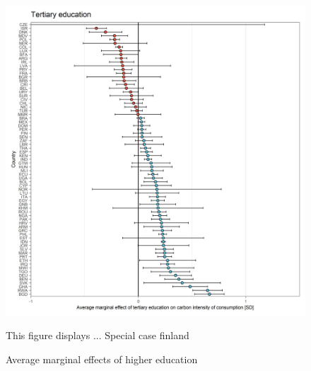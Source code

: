 \documentclass[12pt, a4paper]{article}
\newenvironment{subcaption}
{\strut
\vspace{-5pt}
\begin{minipage}[b]{0.9\textwidth}
  \hspace*{-\parindent}
  \footnotesize}
 {\end{minipage}}
\begin{document}
\begin{figure}[ht!]
  \centering
 \caption{Average marginal effects of higher education} \label{fig:E11_high_edu}
  \includegraphics{Analysis_OLS_ME_Carbon_Intensity/AME_OLS_CI_higher_education}
  \begin{subcaption}
    This figure displays ... Special case finland
  \end{subcaption}

\end{figure}

\clearpage
\end{document}
